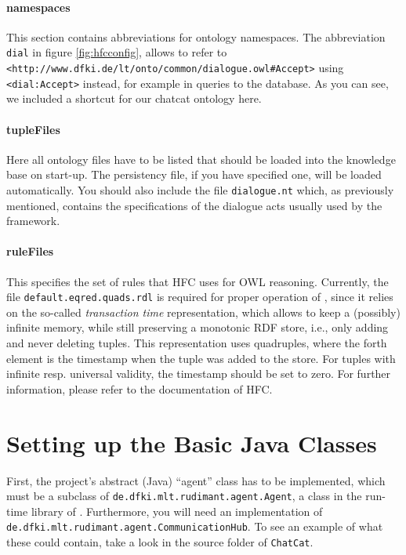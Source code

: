 \paragraph{namespaces}

This section contains abbreviations for ontology namespaces. The abbreviation
\texttt{dial} in figure \ref{fig:hfcconfig}, allows to refer to
\texttt{<http://www.dfki.de/lt/onto/common/dialogue.owl\#Accept>} using
\texttt{<dial:Accept>} instead, for example in queries to the database. As
you can see, we included a shortcut for our chatcat ontology here.

\paragraph{tupleFiles}

Here all ontology files have to be listed that should be loaded into the
knowledge base on start-up. The persistency file, if you have specified one,
will be loaded automatically. You should also include the file
\texttt{dialogue.nt} which, as previously mentioned, contains the
specifications of the dialogue acts usually used by the \vonda framework.

\paragraph{ruleFiles}

This specifies the set of rules that HFC uses for OWL reasoning. Currently, the
file \texttt{default.eqred.quads.rdl} is required for proper operation of
\vonda, since it relies on the so-called \emph{transaction time}
representation, which allows to keep a (possibly) infinite memory, while still
preserving a monotonic RDF store, i.e., only adding and never deleting
tuples. This representation uses quadruples, where the forth element is the
timestamp when the tuple was added to the store. For tuples with infinite
resp. universal validity, the timestamp should be set to zero. For further
information, please refer to the documentation of HFC.

\section{Setting up the Basic Java Classes}

First, the project's abstract (Java) ``agent'' class has to be implemented,
which must be a subclass of \texttt{de.dfki.mlt.rudimant.agent.Agent}, a class
in the run-time library of \vonda. Furthermore, you will need an implementation
of \texttt{de.dfki.mlt.rudimant.agent.CommunicationHub}. To see an example of
what these could contain, take a look in the source folder of \texttt{ChatCat}.

